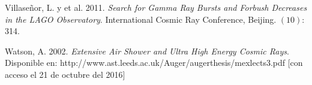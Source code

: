 \documentclass{book}
\begin{document}
\begin{thebibliography}{9}
 Villase\~nor, L. y et al. 2011. \textit{Search for Gamma Ray Bursts and Forbush Decreases in the LAGO Observatory}. International Cosmic Ray Conference, Beijing. $(10)$: 314.

 Watson, A. 2002. \textit{Extensive Air Shower and Ultra High Energy Cosmic Rays}. Disponible en: http://www.ast.leeds.ac.uk/Auger/augerthesis/mexlects3.pdf [con acceso el 21 de octubre del 2016]


\end{thebibliography}




\end{document}
